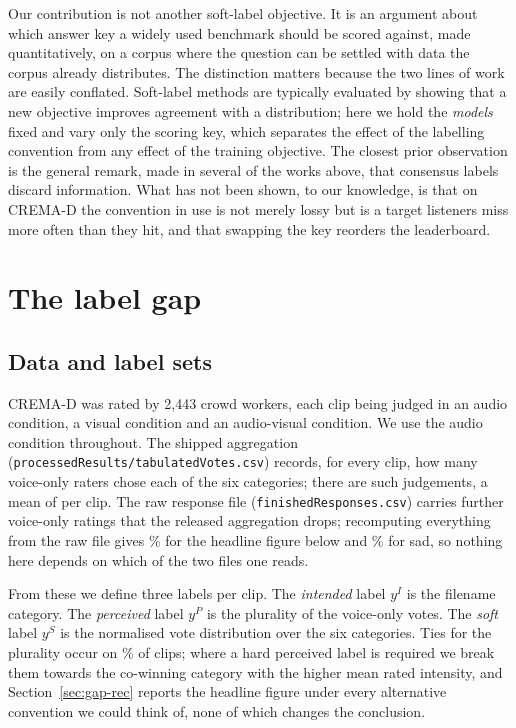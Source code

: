 \documentclass{article}
\begin{document}
Our contribution is not another soft-label objective. It is an argument about
which answer key a widely used benchmark should be scored against, made
quantitatively, on a corpus where the question can be settled with data the
corpus already distributes. The distinction matters because the two lines of
work are easily conflated. Soft-label methods are typically evaluated by showing
that a new objective improves agreement with a distribution; here we hold the
\emph{models} fixed and vary only the scoring key, which separates the effect of
the labelling convention from any effect of the training objective. The closest
prior observation is the general remark, made in several of the works above,
that consensus labels discard information. What has not been shown, to our
knowledge, is that on CREMA-D the convention in use is not merely lossy but is a
target listeners miss more often than they hit, and that swapping the key
reorders the leaderboard.

\section{The label gap}
\label{sec:gap}

\subsection{Data and label sets}

CREMA-D was rated by 2{,}443 crowd workers, each clip being judged in an audio
condition, a visual condition and an audio-visual condition. We use the audio
condition throughout. The shipped aggregation
(\texttt{processedResults/tabulatedVotes.csv}) records, for every clip, how many
voice-only raters chose each of the six categories; there are \NRatings{} such
judgements, a mean of \MeanRaters{} per clip. The raw response file
(\texttt{finishedResponses.csv}) carries \RawExtra{} further voice-only ratings
that the released aggregation drops; recomputing everything from the raw file
gives \RawRecovery\% for the headline figure below and \RawSad\% for sad, so
nothing here depends on which of the two files one reads.

From these we define three labels per clip. The \emph{intended} label $y^{I}$ is
the filename category. The \emph{perceived} label $y^{P}$ is the plurality of
the voice-only votes. The \emph{soft} label $y^{S}$ is the normalised vote
distribution over the six categories. Ties for the plurality occur on
\TiedPct\% of clips; where a hard perceived label is required we break them
towards the co-winning category with the higher mean rated intensity, and
Section~\ref{sec:gap-rec} reports the headline figure under every alternative
convention we could think of, none of which changes the conclusion.
\end{document}
